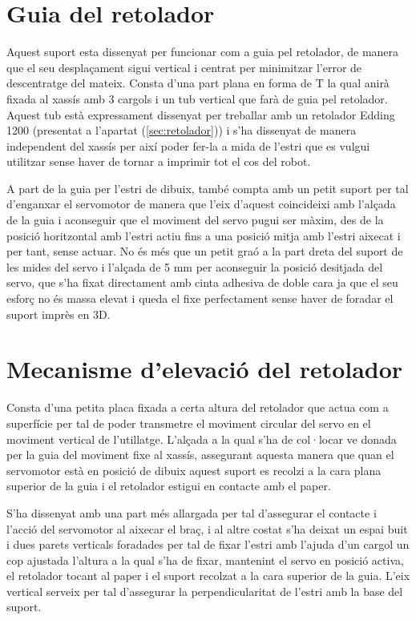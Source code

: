 \section{Guia del retolador}

Aquest suport esta dissenyat per funcionar com a guia pel retolador, de manera que el seu desplaçament sigui vertical i centrat per minimitzar l’error de descentratge del mateix. Consta d’una part plana en forma de T la qual anirà fixada al xassís amb 3 cargols i un tub vertical que farà de guia pel retolador. Aquest tub està expressament dissenyat per treballar amb un retolador Edding 1200 (presentat a l’apartat (\ref{sec:retolador})) i s’ha dissenyat de manera independent del xassís per així poder fer-la a mida de l’estri que es vulgui utilitzar sense haver de tornar a imprimir tot el cos del robot. 

A part de la guia per l’estri de dibuix, també compta amb un petit suport per tal d’enganxar el servomotor de manera que l’eix d’aquest coincideixi amb l’alçada de la guia i aconseguir que el moviment del servo pugui ser màxim, des de la posició horitzontal amb l’estri actiu fins a una posició mitja amb l’estri aixecat i per tant, sense actuar. No és més que un petit graó a la part dreta del suport de les mides del servo i l’alçada de 5 mm per aconseguir la posició desitjada del servo, que s’ha fixat directament amb cinta adhesiva de doble cara ja que el seu esforç no és massa elevat i queda el fixe perfectament sense haver de foradar el suport imprès en 3D. 

\section{Mecanisme d'elevació del retolador} \label{sec:suportmobil}

Consta d’una petita placa fixada a certa altura del retolador que actua com a superfície per tal de poder transmetre el moviment circular del servo en el moviment vertical de l’utillatge. L’alçada a la qual s’ha de col·locar ve donada per la guia del moviment fixe al xassís, assegurant aquesta manera que quan el servomotor està en posició de dibuix aquest suport es recolzi a la cara plana superior de la guia i el retolador estigui en contacte amb el paper. 

S’ha dissenyat amb una part més allargada per tal d’assegurar el contacte i l’acció del servomotor al aixecar el braç, i al altre costat s’ha deixat un espai buit i dues parets verticals foradades per tal de fixar l’estri amb l’ajuda d’un cargol un cop ajustada l'altura a la qual s'ha de fixar, mantenint el servo en posició activa, el retolador tocant al paper i el suport recolzat a la cara superior de la guia. L’eix vertical serveix per tal d’assegurar la perpendicularitat de l’estri amb la base del suport. 

